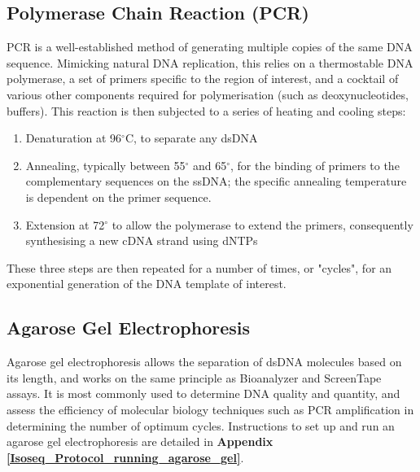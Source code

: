 \subsection{Polymerase Chain Reaction (PCR)}
\label{section:ch2_PCR_explanation} 
PCR is a well-established method of generating multiple copies of the same DNA sequence. Mimicking natural DNA replication, this relies on a thermostable DNA polymerase, a set of primers specific to the region of interest, and a cocktail of various other components required for polymerisation (such as deoxynucleotides, buffers). This reaction is then subjected to a series of heating and cooling steps: 
\begin{enumerate}
	\item Denaturation at 96$^{\circ}$C, to separate any dsDNA 
	\item Annealing, typically between 55$^{\circ}$  and 65$^{\circ}$, for the binding of primers to the complementary sequences on the ssDNA; the specific annealing temperature is dependent on the primer sequence. 
	\item Extension at 72$^{\circ}$ to allow the polymerase to extend the primers, consequently synthesising a new cDNA strand using dNTPs
\end{enumerate} 
These three steps are then repeated for a number of times, or "cycles", for an exponential generation of the DNA template of interest.

\subsection{Agarose Gel Electrophoresis}
\label{section:ch2_agarose_explanation}  
Agarose gel electrophoresis allows the separation of dsDNA molecules based on its length, and works on the same principle as Bioanalyzer and ScreenTape assays. It is most commonly used to determine DNA quality and quantity, and assess the efficiency of molecular biology techniques such as PCR amplification in determining the number of optimum cycles. Instructions to set up and run an agarose gel electrophoresis are detailed in \textbf{Appendix \ref{Isoseq_Protocol_running_agarose_gel}}.


